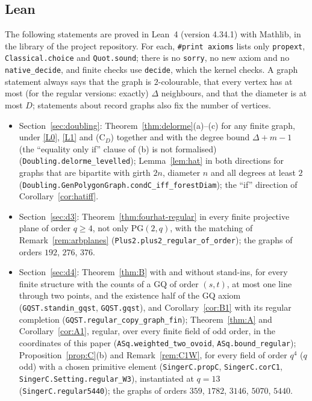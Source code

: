\documentclass[11pt]{amsart}
\theoremstyle{definition}
\theoremstyle{remark}
\newcommand{\PG}{\mathrm{PG}}
\begin{document}
\subsection{Lean}
The following statements are proved in Lean~4 (version 4.34.1) with Mathlib, in the library  of the project repository. For each, \texttt{\#print axioms} lists only \texttt{propext}, \texttt{Classical.choice} and \texttt{Quot.sound}; there is no \texttt{sorry}, no new axiom and no \texttt{native\_decide}, and finite checks use \texttt{decide}, which the kernel checks. A graph statement always says that the graph is $2$-colourable, that every vertex has at most (for the regular versions: exactly) $\Delta$ neighbours, and that the diameter is at most $D$; statements about record graphs also fix the number of vertices.
{\sloppy
\begin{itemize}[leftmargin=1.5em]
\item Section~\ref{sec:doubling}: Theorem~\ref{thm:delorme}(a)--(c) for any finite graph, under \ref{L0}, \ref{L1} and \textup{(C$_D$)} together and with the degree bound $\Delta+m-1$ (the ``equality only if'' clause of (b) is not formalised) (\texttt{Doubling.delorme\_levelled}); Lemma~\ref{lem:hat} in both directions for graphs that are bipartite with girth $2n$, diameter $n$ and all degrees at least $2$ (\texttt{Doubling.GenPolygonGraph.condC\_iff\_forestDiam}); the ``if'' direction of Corollary~\ref{cor:hatiff}.
\item Section~\ref{sec:d3}: Theorem~\ref{thm:fourhat-regular} in every finite projective plane of order $q\ge4$, not only $\PG(2,q)$, with the matching of Remark~\ref{rem:arbplanes} (\texttt{Plus2.plus2\_regular\_of\_order}); the graphs of orders $192$, $276$, $376$.
\item Section~\ref{sec:d4}: Theorem~\ref{thm:B} with and without stand-ins, for every finite structure with the counts of a GQ of order $(s,t)$, at most one line through two points, and the existence half of the GQ axiom (\texttt{GQST.standin\_gqst}, \texttt{GQST.gqst}), and Corollary~\ref{cor:B1} with its regular completion (\texttt{GQST.regular\_copy\_graph\_fin}); Theorem~\ref{thm:A} and Corollary~\ref{cor:A1}, regular, over every finite field of odd order, in the coordinates of this paper (\texttt{ASq.weighted\_two\_ovoid}, \texttt{ASq.bound\_regular}); Proposition~\ref{prop:C}(b) and Remark~\ref{rem:C1W}, for every field of order $q^4$ ($q$ odd) with a chosen primitive element (\texttt{SingerC.propC}, \texttt{SingerC.corC1}, \texttt{SingerC.Setting.regular\_W3}), instantiated at $q=13$ (\texttt{SingerC.regular5440}); the graphs of orders $359$, $1782$, $3146$, $5070$, $5440$.

\end{itemize}}
\end{document}
